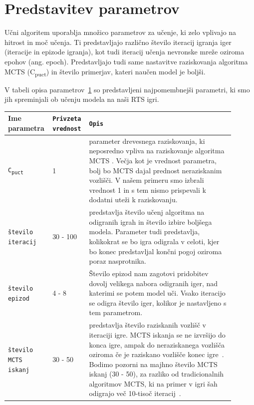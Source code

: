 \documentclass[a4paper, 12pt]{book}
\begin{document}
\section{Predstavitev parametrov}
\label{parametri}
Učni algoritem uporablja množico parametrov za učenje, ki zelo vplivajo na hitrost in moč učenja.
Ti predstavljajo različno število iteracij igranja iger (iteracije in epizode igranja), kot tudi iteracij učenja nevronske mreže oziroma epohov (ang. epoch).
Predstavljajo tudi same nastavitve raziskovanja algoritma MCTS (C\textsubscript{puct}) in število primerjav, kateri naučen model je boljši.

V tabeli opisa parametrov~\ref{tableParameters1} so predstavljeni najpomembnejši parametri, ki smo jih spreminjali ob učenju modela na naši RTS igri.
\begin{table}
	\begin{center}
		\begin{tabular}{p{0.15\linewidth}|p{0.13\linewidth}|p{0.62\linewidth}}
			Ime parametra                             & {\tt Privzeta vrednost} & {\tt Opis} \\ \hline
			{\tt C\textsubscript{puct}}               & 1 						& parameter drevesnega raziskovanja, ki neposredno vpliva na raziskovanje algoritma MCTS . 
																				  Večja kot je vrednost parametra, bolj bo MCTS dajal prednost neraziskanim vozlišči. 
																				  V našem primeru smo izbrali vrednost 1 in s tem nismo prispevali k dodatni uteži k raziskovanju.\\
			{\tt število iteracij}                    & 30 - 100				& predstavlja število učenj algoritma na odigranih igrah in število izbire boljšega modela.
																				  Parameter tudi predstavlja, kolikokrat se bo igra odigrala v celoti, kjer bo konec predstavljal končni pogoj oziroma poraz nasprotnika.\\
			{\tt število epizod}                      & 4 - 8 					& Število epizod nam zagotovi pridobitev dovolj velikega nabora odigranih iger, nad katerimi se potem model uči.
																				  Vsako iteracijo se odigra število iger, kolikor je nastavljeno s tem parametrom.\\
			{\tt število MCTS iskanj}                 & 30 - 50					& predstavlja število raziskanih vozlišč v iteraciji igre. 
														 						  MCTS iskanja se ne izvršijo do konca igre, ampak do neraziskanega vozlišča oziroma če je raziskano vozlišče konec igre~\cite{silver2018general}.
														 						  Bodimo pozorni na majhno število MCTS iskanj (30 - 50), za razliko od tradicionalnih algoritmov MCTS, ki na primer v igri šah odigrajo več 10-tisoč iteracij~\cite{kohne}.\\ 
		\end{tabular}
	\end{center}
	\label{tableParameters1}
\end{table}
\end{document}
